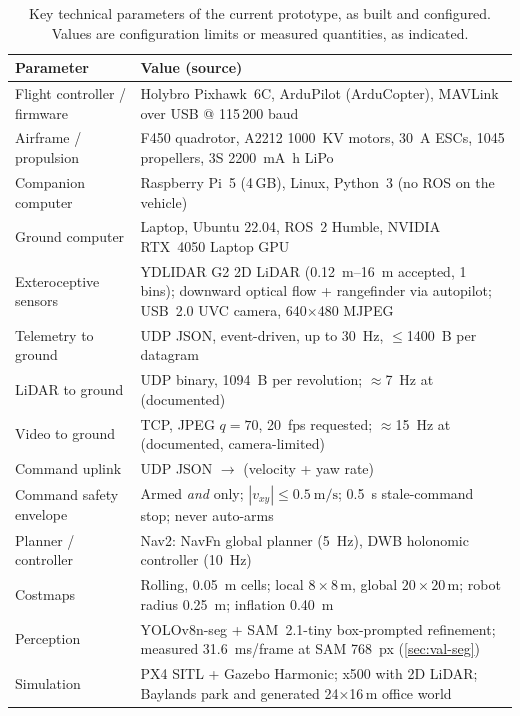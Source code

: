 \begin{table}[H]
\centering
\small
\caption{Key technical parameters of the current prototype, as built and configured. Values are configuration limits or measured quantities, as indicated.}
\label{tab:keyparams}
\renewcommand{\arraystretch}{1.15}
\begin{tabularx}{\textwidth}{p{} L}
\toprule
\textbf{Parameter} & \textbf{Value (source)} \\
\midrule
Flight controller / firmware & Holybro Pixhawk~6C, ArduPilot (ArduCopter), MAVLink over USB @ 115\,200 baud \\
Airframe / propulsion & F450 quadrotor, A2212 \SI{1000}{KV} motors, \SI{30}{\ampere} ESCs, 1045 propellers, 3S \SI{2200}{\milli\ampere\hour} LiPo \\
Companion computer & Raspberry Pi~5 (4\,GB), Linux, Python~3 (no ROS on the vehicle) \\
Ground computer & Laptop, Ubuntu 22.04, ROS~2 Humble, NVIDIA RTX~4050 Laptop GPU \\
Exteroceptive sensors & YDLIDAR G2 2D LiDAR (\SIrange{0.12}{16}{\metre} accepted, 1\textdegree{} bins); downward optical flow + rangefinder via autopilot; USB~2.0 UVC camera, 640$\times$480 MJPEG \\
Telemetry to ground & UDP JSON, event-driven, up to \SI{30}{\hertz}, $\le$\SI{1400}{B} per datagram \\
LiDAR to ground & UDP binary, \SI{1094}{B} per revolution; $\approx$\SI{7}{\hertz} at  (documented) \\
Video to ground & TCP, JPEG $q{=}70$, \SI{20}{fps} requested; $\approx$\SI{15}{\hertz} at  (documented, camera-limited) \\
Command uplink & UDP JSON $\rightarrow$  (velocity + yaw rate) \\
Command safety envelope & Armed \emph{and}  only; $|v_{xy}| \le \SI{0.5}{\metre\per\second}$; \SI{0.5}{\second} stale-command stop; never auto-arms \\
Planner / controller & Nav2: NavFn global planner (\SI{5}{\hertz}), DWB holonomic controller (\SI{10}{\hertz}) \\
Costmaps & Rolling, \SI{0.05}{\metre} cells; local $8\times8$\,m, global $20\times20$\,m; robot radius \SI{0.25}{\metre}; inflation \SI{0.40}{\metre} \\
Perception & YOLOv8n-seg + SAM~2.1-tiny box-prompted refinement; measured \SI{31.6}{\milli\second}/frame at SAM \SI{768}{px} (\cref{sec:val-seg}) \\
Simulation & PX4 SITL + Gazebo Harmonic; x500 with 2D LiDAR; Baylands park and generated 24$\times$16\,m office world \\
\bottomrule
\end{tabularx}
\end{table}
